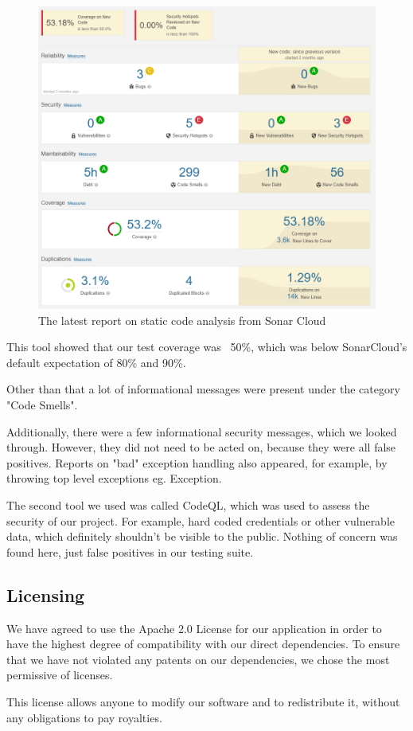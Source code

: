 \begin{figure}[h!]
    \centering
    \includegraphics[scale=0.5]{images/sonar_latest_report.PNG}
    \caption{The latest report on static code analysis from Sonar Cloud}
\end{figure}

This tool showed that our test coverage was ~50\%, which was below SonarCloud's default expectation of 80\% and 90\%.

Other than that a lot of informational messages were present under the category "Code Smells". %

Additionally, there were a few informational security messages, which we looked through. 
However, they did not need to be acted on, because they were all false positives. 
Reports on "bad" exception handling also appeared, for example, by throwing top level exceptions eg. Exception. 

The second tool we used was called CodeQL, which was used to assess the security of our project. 
For example, hard coded credentials or other vulnerable data, which definitely shouldn't be visible to the public. 
Nothing of concern was found here, just false positives in our testing suite.

\newpage

\subsection{Licensing}

We have agreed to use the Apache 2.0 License for our application in order to have the highest degree of compatibility with our direct dependencies. 
To ensure that we have not violated any patents on our dependencies, we chose the most permissive of licenses. 

This license allows anyone to modify our software and to redistribute it, without any obligations to pay royalties.
